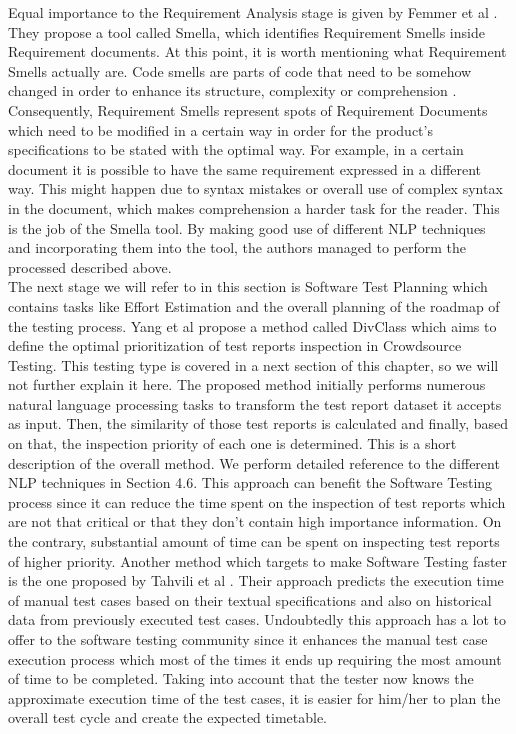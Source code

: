 Equal importance to the Requirement Analysis stage is given by Femmer et al \cite{femmer2017rapid}. They propose a tool called Smella, which identifies Requirement Smells inside 
Requirement documents. At this point, it is worth mentioning what Requirement Smells actually are. Code smells are parts of code that need to be somehow changed in order to enhance 
its structure, complexity or comprehension \cite{fowler2018refactoring}. Consequently, Requirement Smells represent spots of Requirement Documents which need to be modified in a 
certain way in order for the product's specifications to be stated with the optimal way. For example, in a certain document it is possible to have the same requirement expressed in 
a different way. This might happen due to syntax mistakes or overall use of complex syntax in the document, which makes comprehension a harder task for the reader. This is 
the job of the Smella tool. By making good use of different NLP techniques and incorporating them into the tool, the authors managed to perform the processed described above. \\

The next stage we will refer to in this section is Software Test Planning which contains tasks like Effort Estimation and the overall planning of the roadmap of the testing 
process. Yang et al \cite{9617598} propose a method called DivClass which aims to define the optimal prioritization of test reports inspection in Crowdsource Testing. This testing type 
is covered in a next section of this chapter, so we will not further explain it here. The proposed method initially performs numerous natural language processing tasks to transform the 
test report dataset it accepts as input. Then, the similarity of those test reports is calculated and finally, based on that, the inspection priority of each one is determined. This is a 
short description of the overall method. We perform detailed reference to the different NLP techniques in Section 4.6. This approach can benefit the Software Testing process since it can 
reduce the time spent on the inspection of test reports which are not that critical or that they don't contain high importance information. On the contrary, substantial amount of time 
can be spent on inspecting test reports of higher priority. Another method which targets to make Software Testing faster is the one proposed by Tahvili et al \cite{8051381}. Their approach 
predicts the execution time of manual test cases based on their textual specifications and also on historical data from previously executed test cases. Undoubtedly this approach has a lot 
to offer to the software testing community since it enhances the manual test case execution process which most of the times it ends up requiring the most amount of time to be completed. Taking 
into account that the tester now knows the approximate execution time of the test cases, it is easier for him/her to plan the overall test cycle and create the expected timetable. \\

